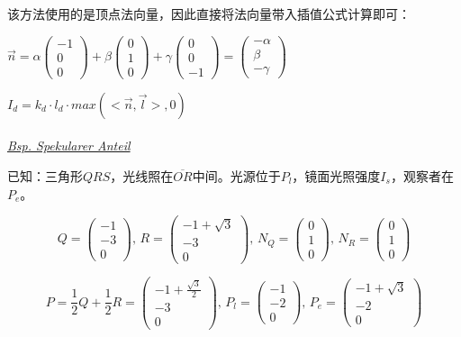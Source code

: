 \documentclass[fleqn]{article}
\begin{document}
该方法使用的是顶点法向量，因此直接将法向量带入插值公式计算即可：

$\vec{n} = \alpha\begin{pmatrix}-1\\0\\0 \end{pmatrix} + \beta\begin{pmatrix}0\\1\\0 \end{pmatrix} + \gamma \begin{pmatrix}0\\0\\-1 \end{pmatrix}=\begin{pmatrix}-\alpha\\\beta\\-\gamma \end{pmatrix}$ 

$I_d = k_d\cdot l_d\cdot max(<\vec{n},\vec{l}>,0)$
\\
\\
\underline{\textit{Bsp. Spekularer Anteil}}

已知：三角形$QRS$，光线照在$\overline{OR}$中间。光源位于$P_l$，镜面光照强度$I_s$，观察者在$P_e$。

$$Q=\begin{pmatrix}
    -1\\-3\\0
\end{pmatrix},\,R=\begin{pmatrix}
    -1+\sqrt{3}\\-3\\0
\end{pmatrix},\,N_Q=\begin{pmatrix}
    0\\1\\0
\end{pmatrix},\,N_R=\begin{pmatrix}
    0\\1\\0
\end{pmatrix}$$

$$P=\frac{1}{2}Q+\frac{1}{2}R=\begin{pmatrix}
    -1+\frac{\sqrt{3}}{2}\\-3\\0
\end{pmatrix},\,P_l=\begin{pmatrix}
    -1\\-2\\0
\end{pmatrix},\,P_e=\begin{pmatrix}
    -1+\sqrt{3}\\-2\\0
\end{pmatrix}$$
\end{document}
